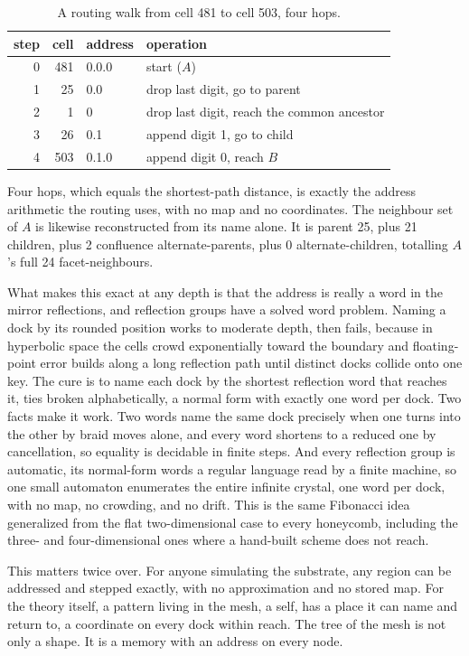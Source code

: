 \begin{table}[ht]
\centering
\begin{tabular}{@{}rrll@{}}
\toprule
step & cell & address & operation \\
\midrule
0 & 481 & 0.0.0 & start ($A$) \\
1 & 25  & 0.0   & drop last digit, go to parent \\
2 & 1   & 0     & drop last digit, reach the common ancestor \\
3 & 26  & 0.1   & append digit 1, go to child \\
4 & 503 & 0.1.0 & append digit 0, reach $B$ \\
\bottomrule
\end{tabular}
\caption{A routing walk from cell 481 to cell 503, four hops.}
\end{table}

Four hops, which equals the shortest-path distance, is exactly the address arithmetic the routing uses, with no map and no coordinates. The neighbour set of $A$ is likewise reconstructed from its name alone. It is parent 25, plus 21 children, plus 2 confluence alternate-parents, plus 0 alternate-children, totalling $A$'s full 24 facet-neighbours.

What makes this exact at any depth is that the address is really a word in the mirror reflections, and reflection groups have a solved word problem. Naming a dock by its rounded position works to moderate depth, then fails, because in hyperbolic space the cells crowd exponentially toward the boundary and floating-point error builds along a long reflection path until distinct docks collide onto one key. The cure is to name each dock by the shortest reflection word that reaches it, ties broken alphabetically, a normal form with exactly one word per dock. Two facts make it work. Two words name the same dock precisely when one turns into the other by braid moves alone, and every word shortens to a reduced one by cancellation, so equality is decidable in finite steps. And every reflection group is automatic, its normal-form words a regular language read by a finite machine, so one small automaton enumerates the entire infinite crystal, one word per dock, with no map, no crowding, and no drift. This is the same Fibonacci idea generalized from the flat two-dimensional case to every honeycomb, including the three- and four-dimensional ones where a hand-built scheme does not reach.

This matters twice over. For anyone simulating the substrate, any region can be addressed and stepped exactly, with no approximation and no stored map. For the theory itself, a pattern living in the mesh, a self, has a place it can name and return to, a coordinate on every dock within reach. The tree of the mesh is not only a shape. It is a memory with an address on every node.
